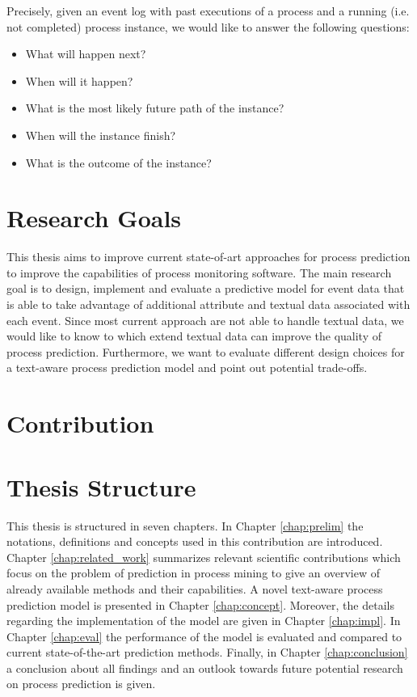 Precisely, given an event log with past executions of a process and a running (i.e. not completed) process instance, we would like to answer the following questions:

\begin{itemize}
	\item What will happen next?
	\item When will it happen?
	\item What is the most likely future path of the instance?
	\item When will the instance finish?
	\item What is the outcome of the instance?
\end{itemize}



\section{Research Goals}

This thesis aims to improve current state-of-art approaches for process prediction to improve the capabilities of process monitoring software.
The main research goal is to design, implement and evaluate a predictive model for event data that is able to take advantage of additional attribute and textual data associated with each event.
Since most current approach are not able to handle textual data, we would like to know to which extend textual data can improve the quality of process prediction.
Furthermore, we want to evaluate different design choices for a text-aware process prediction model and point out potential trade-offs.

\section{Contribution}



\section{Thesis Structure}

This thesis is structured in seven chapters.
In Chapter \ref{chap:prelim} the notations, definitions and concepts used in this contribution are introduced.
Chapter \ref{chap:related_work} summarizes relevant scientific contributions which focus on the problem of prediction in process mining to give an overview of already available methods and their capabilities.
A novel text-aware process prediction model is presented in Chapter \ref{chap:concept}.
Moreover, the details regarding the implementation of the model are given in Chapter \ref{chap:impl}.
In Chapter \ref{chap:eval} the performance of the model is evaluated and compared to current state-of-the-art prediction methods.
Finally, in Chapter \ref{chap:conclusion} a conclusion about all findings and an outlook towards future potential research on process prediction is given.